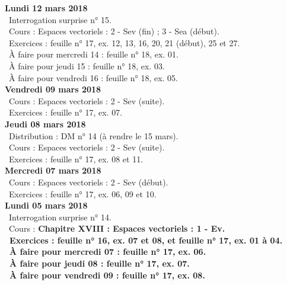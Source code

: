 \documentclass[12pt,a4paper]{article}
\begin{document}
\noindent\textbf{\bf Lundi 12 mars 2018} \\
\bu\ Interrogation surprise n° 15.\\
\bu\ Cours : Espaces vectoriels : 2 - Sev (fin) ; 3 - Sea (début).\\
\bu\ Exercices : feuille n° 17, ex. 12, 13, 16, 20, 21 (début), 25 et 27.\\
\bu\ À faire pour mercredi 14 : feuille n° 18, ex. 01.\\
\bu\ À faire pour jeudi 15 : feuille n° 18, ex. 03.\\
\bu\ À faire pour vendredi 16 : feuille n° 18, ex. 05.\vspace{.4cm}\\

\noindent\textbf{Vendredi 09 mars 2018}\\
\bu\ Cours : Espaces vectoriels : 2 - Sev (suite).\\
\bu\ Exercices : feuille n° 17, ex. 07.\vspace{.4cm}\\

\noindent\textbf{Jeudi 08 mars 2018}\\
\bu\ Distribution : DM n° 14 (à rendre le 15 mars).\\
\bu\ Cours : Espaces vectoriels : 2 - Sev (suite).\\
\bu\ Exercices : feuille n° 17, ex. 08 et 11.\vspace{.4cm}\\

\noindent\textbf{Mercredi 07 mars 2018} \\
\bu\ Cours : Espaces vectoriels : 2 - Sev (début).\\
\bu\ Exercices : feuille n° 17, ex. 06, 09 et 10.\vspace{.4cm}\\

\noindent\textbf{\bf Lundi 05 mars 2018} \\
\bu\ Interrogation surprise n° 14.\\
\bu\ Cours : \bf Chapitre XVIII \rm : Espaces vectoriels : 1 - Ev.\\
\bu\ Exercices : feuille n° 16, ex. 07 et 08, et feuille n° 17, ex. 01 à 04.\\
\bu\ À faire pour mercredi 07 : feuille n° 17, ex. 06.\\
\bu\ À faire pour jeudi 08 : feuille n° 17, ex. 07.\\
\bu\ À faire pour vendredi 09 : feuille n° 17, ex. 08.\vspace{.4cm}\\
\end{document}
